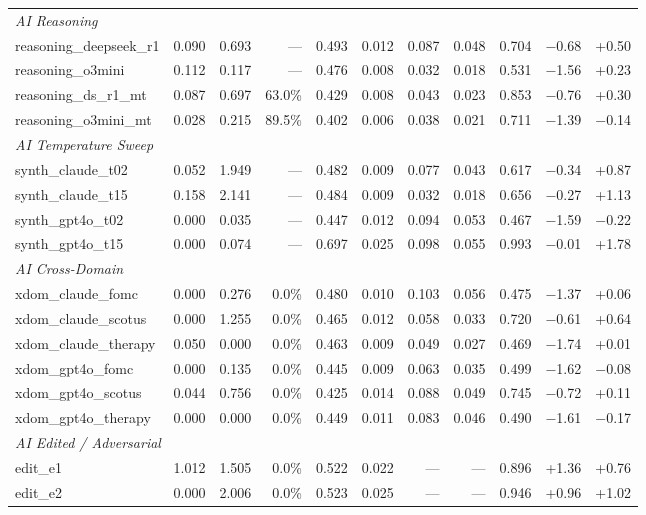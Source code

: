 \documentclass[final]{clv2025}
\begin{document}
\begin{landscape}
\begin{table}[p]
\begin{tabular}{lrrrrrrrrrr}
\midrule
\multicolumn{11}{l}{\textit{AI Reasoning}} \\
reasoning\_deepseek\_r1 & 0.090 & 0.693 & --- & 0.493 & 0.012 & 0.087 & 0.048 & 0.704 & $-$0.68 & +0.50 \\
reasoning\_o3mini & 0.112 & 0.117 & --- & 0.476 & 0.008 & 0.032 & 0.018 & 0.531 & $-$1.56 & +0.23 \\
reasoning\_ds\_r1\_mt & 0.087 & 0.697 & 63.0\% & 0.429 & 0.008 & 0.043 & 0.023 & 0.853 & $-$0.76 & +0.30 \\
reasoning\_o3mini\_mt & 0.028 & 0.215 & 89.5\% & 0.402 & 0.006 & 0.038 & 0.021 & 0.711 & $-$1.39 & $-$0.14 \\
\midrule
\multicolumn{11}{l}{\textit{AI Temperature Sweep}} \\
synth\_claude\_t02 & 0.052 & 1.949 & --- & 0.482 & 0.009 & 0.077 & 0.043 & 0.617 & $-$0.34 & +0.87 \\
synth\_claude\_t15 & 0.158 & 2.141 & --- & 0.484 & 0.009 & 0.032 & 0.018 & 0.656 & $-$0.27 & +1.13 \\
synth\_gpt4o\_t02 & 0.000 & 0.035 & --- & 0.447 & 0.012 & 0.094 & 0.053 & 0.467 & $-$1.59 & $-$0.22 \\
synth\_gpt4o\_t15 & 0.000 & 0.074 & --- & 0.697 & 0.025 & 0.098 & 0.055 & 0.993 & $-$0.01 & +1.78 \\
\midrule
\multicolumn{11}{l}{\textit{AI Cross-Domain}} \\
xdom\_claude\_fomc & 0.000 & 0.276 & 0.0\% & 0.480 & 0.010 & 0.103 & 0.056 & 0.475 & $-$1.37 & +0.06 \\
xdom\_claude\_scotus & 0.000 & 1.255 & 0.0\% & 0.465 & 0.012 & 0.058 & 0.033 & 0.720 & $-$0.61 & +0.64 \\
xdom\_claude\_therapy & 0.050 & 0.000 & 0.0\% & 0.463 & 0.009 & 0.049 & 0.027 & 0.469 & $-$1.74 & +0.01 \\
xdom\_gpt4o\_fomc & 0.000 & 0.135 & 0.0\% & 0.445 & 0.009 & 0.063 & 0.035 & 0.499 & $-$1.62 & $-$0.08 \\
xdom\_gpt4o\_scotus & 0.044 & 0.756 & 0.0\% & 0.425 & 0.014 & 0.088 & 0.049 & 0.745 & $-$0.72 & +0.11 \\
xdom\_gpt4o\_therapy & 0.000 & 0.000 & 0.0\% & 0.449 & 0.011 & 0.083 & 0.046 & 0.490 & $-$1.61 & $-$0.17 \\
\midrule
\multicolumn{11}{l}{\textit{AI Edited / Adversarial}} \\
edit\_e1 & 1.012 & 1.505 & 0.0\% & 0.522 & 0.022 & --- & --- & 0.896 & +1.36 & +0.76 \\
edit\_e2 & 0.000 & 2.006 & 0.0\% & 0.523 & 0.025 & --- & --- & 0.946 & +0.96 & +1.02 \\

\end{tabular}
\end{table}
\end{landscape}
\end{document}
